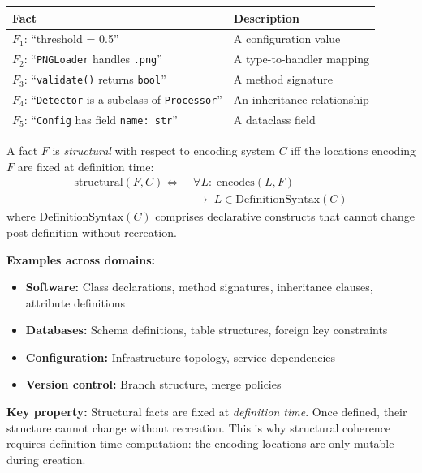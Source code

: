 \begin{center}
\small
\setlength{\tabcolsep}{3pt}
\begin{tabularx}{\linewidth}{@{}>{\RaggedRight\arraybackslash\hsize=0.95\hsize}X>{\RaggedRight\arraybackslash\hsize=1.05\hsize}X@{}}
\toprule
\textbf{Fact} & \textbf{Description} \\
\midrule
$F_1$: ``threshold = 0.5'' & A configuration value \\
$F_2$: ``\texttt{PNGLoader} handles \texttt{.png}'' & A type-to-handler mapping \\
$F_3$: ``\texttt{validate()} returns \texttt{bool}'' & A method signature \\
$F_4$: ``\texttt{Detector} is a subclass of \texttt{Processor}'' & An inheritance relationship \\
$F_5$: ``\texttt{Config} has field \texttt{name: str}'' & A dataclass field \\
\bottomrule
\end{tabularx}
\end{center}

\begin{definition}\label{def:structural-fact}
A fact $F$ is \emph{structural} with respect to encoding system $C$ iff the locations encoding $F$ are fixed at definition time:
\[
\begin{aligned}
\text{structural}(F, C) \Longleftrightarrow\;
&\forall L:\; \text{encodes}(L, F) \\
&\rightarrow\; L \in \text{DefinitionSyntax}(C)
\end{aligned}
\]
where $\text{DefinitionSyntax}(C)$ comprises declarative constructs that cannot change post-definition without recreation.
\end{definition}

\textbf{Examples across domains:}
\begin{itemize}
\tightlist
\item \textbf{Software:} Class declarations, method signatures, inheritance clauses, attribute definitions
\item \textbf{Databases:} Schema definitions, table structures, foreign key constraints
\item \textbf{Configuration:} Infrastructure topology, service dependencies
\item \textbf{Version control:} Branch structure, merge policies
\end{itemize}

\textbf{Key property:} Structural facts are fixed at \emph{definition time}. Once defined, their structure cannot change without recreation. This is why structural coherence requires definition-time computation: the encoding locations are only mutable during creation.

